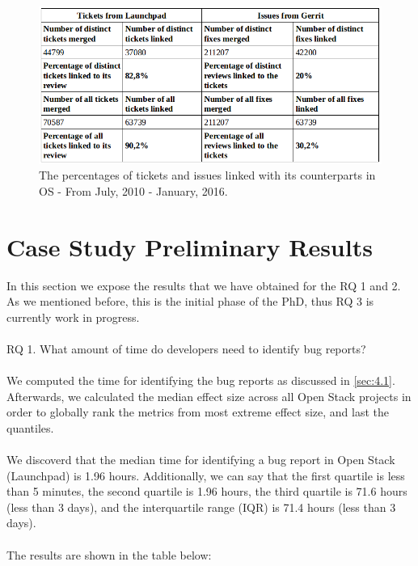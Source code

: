 \documentclass[ifip]{svmult}
\begin{document}
\begin{figure}[H]
\centering

\includegraphics[width=1.0\textwidth,natwidth=778,natheight=326]{t-i.png}

\caption{The percentages of tickets and issues linked with its counterparts in OS - From July, 2010 - January, 2016.}
\label{fig:2}
\end{figure}

\section{Case Study Preliminary Results}
\label{sec:5}

In this section we expose the results that we have obtained for the RQ 1 and 2. As we mentioned before, this is 
the initial phase of the PhD, thus RQ 3 is currently work in progress.
\\
\\
RQ 1. What amount of time do developers need to identify bug reports?
\\
\\
We computed the time for identifying the bug reports as discussed in \ref{sec:4.1}. 
\\
Afterwards, we calculated the median effect size across all Open Stack projects in order to globally rank
the metrics from most extreme effect size, and last the quantiles. 
\\
\\
We discoverd that the median time for identifying a bug report in Open Stack (Launchpad) is 1.96 hours. Additionally, we 
can say that the first quartile is less than 5 minutes, the second quartile is 1.96 hours, the third quartile is 
71.6 hours (less than 3 days), and the interquartile range (IQR) is 71.4 hours (less than 3 days).  
\\
\\
The results are shown in the table below:
\end{document}
